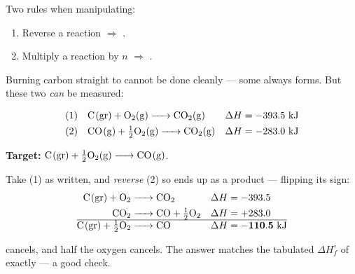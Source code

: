 \documentclass{apchem-notes}
\begin{document}


\begin{center}
\end{center}

Two rules when manipulating:

\begin{enumerate}[leftmargin=*,itemsep=0.3em]
  \item Reverse a reaction $\Rightarrow$
        .
  \item Multiply a reaction by $n$ $\Rightarrow$
        .
\end{enumerate}

\begin{workedexample}
Burning carbon straight to  cannot be done cleanly --- some
 always forms. But these two \emph{can} be measured:

\begin{align*}
  (1)&\quad \ce{C(gr) + O2(g) -> CO2(g)}
     &\Delta H &= -393.5~\text{kJ} \\
  (2)&\quad \ce{CO(g) + \tfrac{1}{2}O2(g) -> CO2(g)}
     &\Delta H &= -283.0~\text{kJ}
\end{align*}

\textbf{Target:} $\ce{C(gr) + \tfrac{1}{2}O2(g) -> CO(g)}$.

Take (1) as written, and \emph{reverse} (2) so  ends up as a
product --- flipping its sign:
\begin{align*}
  \ce{C(gr) + O2 &-> CO2} &\Delta H &= -393.5 \\
  \ce{CO2 &-> CO + \tfrac{1}{2}O2} &\Delta H &= +283.0 \\
  \hline
  \ce{C(gr) + \tfrac{1}{2}O2 &-> CO} &\Delta H &= \mathbf{-110.5}~\text{kJ}
\end{align*}

 cancels, and half the oxygen cancels. The answer matches the
tabulated $\Delta H_f^\circ$ of  exactly --- a good check.
\end{workedexample}
\end{document}
